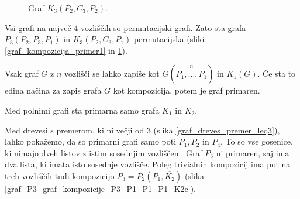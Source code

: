 \documentclass[a4paper, 12pt]{book}
\begin{document}
\begin{figure}[h]
    \begin{center}        
    \end{center}
    \caption{Graf $K_3(P_2, C_3, P_2)$.}
    \label{graf_kompozicija_primer2}
\end{figure}

Vsi grafi na največ $4$ vozliščih so permutacijski grafi. Zato sta grafa $P_3(P_2, P_3, P_1)$ in $K_3(P_2, C_3, P_1)$ permutacijska (sliki \ref{graf_kompozicija_primer1} in \ref{graf_kompozicija_primer2}).

Vsak graf $G$ z $n$ vozlišči se lahko zapiše kot $G(\overset{n}{\overline{P_1, ..., P_1}})$ in $K_1(G)$. Če sta to edina načina za zapis grafa $G$ kot kompozicija, potem je graf primaren.

Med polnimi grafi sta primarna samo grafa $K_1$ in $K_2$.

Med drevesi s premerom, ki ni večji od 3 (slika \ref{graf_dreves_premer_leq3}), lahko pokažemo, da so primarni grafi samo poti $P_1, P_2$ in $P_4$. To so vse gosenice, ki nimajo dveh listov z istim sosednjim vozliščem. Graf $P_3$ ni primaren, saj ima dva lista, ki imata isto sosednje vozlišče. Poleg trivialnih kompozicij ima pot na treh vozliščih tudi kompozicijo $P_3 = P_2(P_1, \overline{K_2})$ (slika \ref{graf_P3_graf_kompozicije_P3_P1_P1_P1_K2c}).
\end{document}
